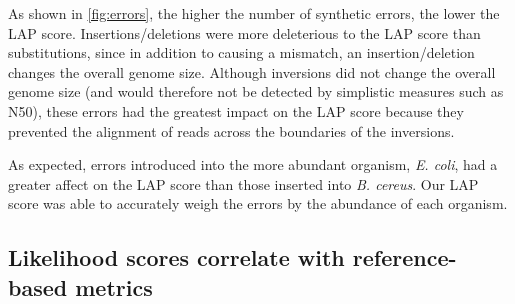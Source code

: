 As shown in \figurename \ref{fig:errors}, the higher the number of synthetic errors, the lower the LAP score.
Insertions/deletions were more deleterious to the LAP score than substitutions, since in addition to causing a mismatch, an insertion/deletion changes the overall genome size.
Although inversions did not change the overall genome size (and would therefore not be detected by simplistic measures such as N50), these errors had the greatest impact on the LAP score because they prevented the alignment of reads across the boundaries of the inversions.


As expected, errors introduced into the more abundant organism, \emph{E. coli}, had a greater affect on the LAP score than those inserted into \emph{B. cereus}.
Our LAP score was able to accurately weigh the errors by the abundance of each organism.


\subsection{Likelihood scores correlate with reference-based metrics}


